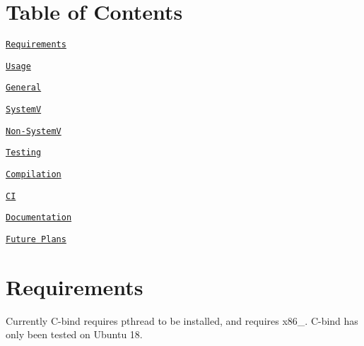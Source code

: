 \href{https://travis-ci.org/zwimer/C-bind}{\tt }

\section*{Table of Contents}


\begin{DoxyEnumerate}
\item \href{#requirements}{\tt Requirements}
\end{DoxyEnumerate}
\begin{DoxyEnumerate}
\item \href{#usage}{\tt Usage}
\begin{DoxyItemize}
\item \href{#general}{\tt General}
\item \href{#systemv}{\tt SystemV}
\item \href{#non-systemv}{\tt Non-\/\+SystemV}
\end{DoxyItemize}
\end{DoxyEnumerate}
\begin{DoxyEnumerate}
\item \href{#testing}{\tt Testing}
\end{DoxyEnumerate}
\begin{DoxyEnumerate}
\item \href{#compilation}{\tt Compilation}
\end{DoxyEnumerate}
\begin{DoxyEnumerate}
\item \href{#ci}{\tt CI}
\end{DoxyEnumerate}
\begin{DoxyEnumerate}
\item \href{#documentation}{\tt Documentation}
\end{DoxyEnumerate}
\begin{DoxyEnumerate}
\item \href{#future-plans}{\tt Future Plans} 


\end{DoxyEnumerate}

\section*{Requirements}

Currently {\ttfamily C-\/bind} requires {\ttfamily pthread} to be installed, and requires {\ttfamily x86\+\_}. {\ttfamily C-\/bind} has only been tested on {\ttfamily Ubuntu 18.}

